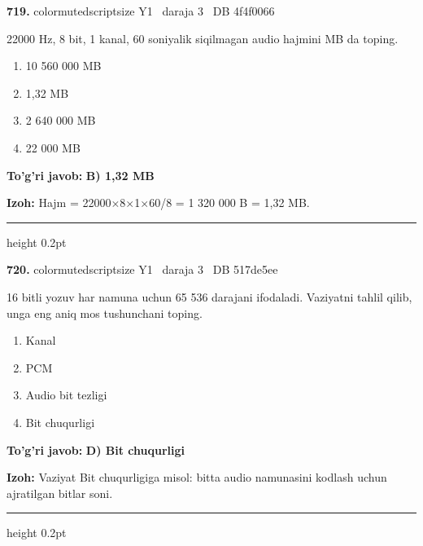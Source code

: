 \documentclass[10pt,a4paper,oneside]{article}
\begin{document}
\noindent\textbf{\color{ink}719.}  {color{muted}scriptsize Y1 \textbullet\ daraja 3 \textbullet\ DB 4f4f0066}
\par
22000 Hz, 8 bit, 1 kanal, 60 soniyalik siqilmagan audio hajmini MB da toping.
\begin{enumerate}[label=\Alph*),leftmargin=9mm]
\item 10 560 000 MB
\item 1,32 MB
\item 2 640 000 MB
\item 22 000 MB
\end{enumerate}
\begin{tcolorbox}[enhanced,breakable,colback=teal!4,colframe=teal!50!black,boxrule=0.5pt,arc=1.1mm,left=3mm,right=3mm,top=1.7mm,bottom=1.7mm,before skip=2mm,after skip=2mm]
\textbf{\color{teal}To'g'ri javob:} \textbf{B) 1,32 MB}
\par\smallskip
\textbf{Izoh:} Hajm = 22000\ensuremath{\times}8\ensuremath{\times}1\ensuremath{\times}60/8 = 1 320 000 B = 1,32 MB.
\end{tcolorbox}
\vspace{2mm}\hrule height 0.2pt \vspace{3mm}

\noindent\textbf{\color{ink}720.}  {color{muted}scriptsize Y1 \textbullet\ daraja 3 \textbullet\ DB 517de5ee}
\par
16 bitli yozuv har namuna uchun 65 536 darajani ifodaladi. Vaziyatni tahlil qilib, unga eng aniq mos tushunchani toping.
\begin{enumerate}[label=\Alph*),leftmargin=9mm]
\item Kanal
\item PCM
\item Audio bit tezligi
\item Bit chuqurligi
\end{enumerate}
\begin{tcolorbox}[enhanced,breakable,colback=teal!4,colframe=teal!50!black,boxrule=0.5pt,arc=1.1mm,left=3mm,right=3mm,top=1.7mm,bottom=1.7mm,before skip=2mm,after skip=2mm]
\textbf{\color{teal}To'g'ri javob:} \textbf{D) Bit chuqurligi}
\par\smallskip
\textbf{Izoh:} Vaziyat Bit chuqurligiga misol: bitta audio namunasini kodlash uchun ajratilgan bitlar soni.
\end{tcolorbox}
\vspace{2mm}\hrule height 0.2pt \vspace{3mm}
\end{document}
